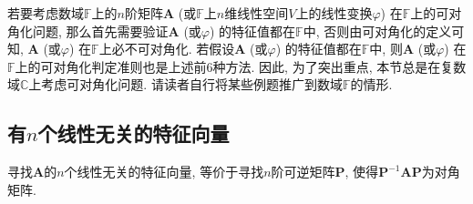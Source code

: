 \documentclass[../../main.tex]{subfiles}
\begin{document}
\begin{remark}
若要考虑数域\(\mathbb{F}\)上的\(n\)阶矩阵\(\boldsymbol{A}\) (或\(\mathbb{F}\)上\(n\)维线性空间\(V\)上的线性变换\(\varphi\)) 在\(\mathbb{F}\)上的可对角化问题, 那么首先需要验证\(\boldsymbol{A}\) (或\(\varphi\)) 的特征值都在\(\mathbb{F}\)中, 否则由可对角化的定义可知, \(\boldsymbol{A}\) (或\(\varphi\)) 在\(\mathbb{F}\)上必不可对角化. 若假设\(\boldsymbol{A}\) (或\(\varphi\)) 的特征值都在\(\mathbb{F}\)中, 则\(\boldsymbol{A}\) (或\(\varphi\)) 在\(\mathbb{F}\)上的可对角化判定准则也是上述前\(6\)种方法. 因此, 为了突出重点, 本节总是在复数域\(\mathbb{C}\)上考虑可对角化问题. 请读者自行将某些例题推广到数域\(\mathbb{F}\)的情形. 
\end{remark}



\subsection{有$n$个线性无关的特征向量}

寻找\(\boldsymbol{A}\)的\(n\)个线性无关的特征向量, 等价于寻找\(n\)阶可逆矩阵\(\boldsymbol{P}\), 使得\(\boldsymbol{P}^{-1}\boldsymbol{AP}\)为对角矩阵.
\end{document}
